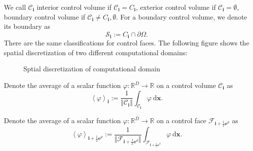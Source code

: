 We call $\mathcal{C}_{\mathbf{i}}$ interior control volume if
$\mathcal{C}_{\mathbf{i}} = C_{\mathbf{i}}$, exterior control volume
if $\mathcal{C}_{\mathbf{i}}=\emptyset$, boundary control volume if
$\mathcal{C}_{\mathbf{i}}\neq C_{\mathbf{i}},\emptyset$. For a
boundary control volume, we denote its boundary as
\begin{equation}
  \label{eq:boundaryOfvolume}
  \mathcal{S}_{\mathbf{i}} := {C}_{\mathbf{i}}\cap\partial\Omega.
\end{equation}
There are the same classifications for control faces. The following
figure shows the spatial discretization of two different computational
domains:

\begin{figure}[htbp]
  \centering
  \hspace{2cm}
  
  \caption{Sptial discretization of computational domain}
  \label{fig:SpatialDiscretizationOfCD}
\end{figure}

\begin{defn}
  Denote the average of a scalar function
  $\varphi:\mathbb{R}^D\rightarrow\mathbb{R}$ on a control volume
  $\mathcal{C}_{\mathbf{i}}$ as
  \begin{equation}
    \left<\varphi\right>_{\mathbf{i}} := \frac{1}{\Vert
      \mathcal{C}_{\mathbf{i}}\Vert}\int_{\mathcal{C}_{\mathbf{i}}}
    \varphi\  \mathrm{d}\mathbf{x}.
  \end{equation}
\end{defn}

\begin{defn}
  Denote the average of a scalar function
  $\varphi:\mathbb{R}^D\rightarrow\mathbb{R}$ on a control face
  $\mathcal{F}_{\mathbf{i}+\frac{1}{2}\mathbf{e}^d}$ as
  \begin{equation}
    \left<\varphi\right>_{\mathbf{i}+\frac{1}{2}\mathbf{e}^d} := \frac{1}{\Vert
      \mathcal{F}_{\mathbf{i}+\frac{1}{2}\mathbf{e}^d}\Vert}\int_{\mathcal{F}_{\mathbf{i}+\frac{1}{2}\mathbf{e}^d}}\varphi\
    \mathrm{d}\mathbf{x}.  
  \end{equation}
\end{defn}

